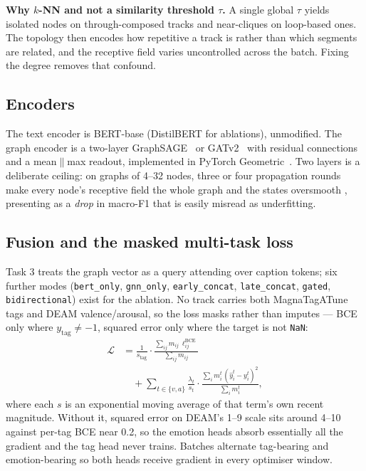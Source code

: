 \documentclass[conference]{IEEEtran}
\begin{document}
\textbf{Why $k$-NN and not a similarity threshold $\tau$.} A single global
$\tau$ yields isolated nodes on through-composed tracks and near-cliques on
loop-based ones. The topology then encodes how repetitive a track is rather than
which segments are related, and the receptive field varies uncontrolled across
the batch. Fixing the degree removes that confound.

\subsection{Encoders}
The text encoder is BERT-base (DistilBERT for ablations), unmodified. The graph
encoder is a two-layer GraphSAGE~\cite{hamilton2017sage} or
GATv2~\cite{brody2022gatv2} with residual connections and a mean$\|$max
readout, implemented in PyTorch Geometric~\cite{fey2019pyg}. Two layers is a deliberate ceiling: on graphs of 4--32
nodes, three or four propagation rounds make every node's receptive field the
whole graph and the states oversmooth \cite{li2018deeper}, presenting as a
\emph{drop} in macro-F1 that is easily misread as underfitting.

\subsection{Fusion and the masked multi-task loss}
Task 3 treats the graph vector as a query attending over caption tokens; six
further modes (\texttt{bert\_only}, \texttt{gnn\_only}, \texttt{early\_concat},
\texttt{late\_concat}, \texttt{gated}, \texttt{bidirectional}) exist for the
ablation. No track carries both MagnaTagATune tags and DEAM valence/arousal, so
the loss masks rather than imputes --- BCE only where
$y_{\text{tag}} \neq -1$, squared error only where the target is not
\texttt{NaN}:
\begin{equation}
\begin{split}
\mathcal{L} &= \frac{1}{s_{\text{tag}}}\cdot
   \frac{\sum_{ij} m_{ij}\,\ell^{\text{BCE}}_{ij}}{\sum_{ij} m_{ij}} \\[2pt]
&\quad + \sum_{t \in \{v,a\}} \frac{\lambda_t}{s_t}\cdot
   \frac{\sum_i m^t_i\,(\hat{y}^t_i - y^t_i)^2}{\sum_i m^t_i},
\end{split}
\end{equation}
where each $s$ is an exponential moving average of that term's own recent
magnitude. Without it, squared error on DEAM's 1--9 scale sits around 4--10
against per-tag BCE near 0.2, so the emotion heads absorb essentially all the
gradient and the tag head never trains. Batches alternate tag-bearing and
emotion-bearing so both heads receive gradient in every optimiser window.
\end{document}
